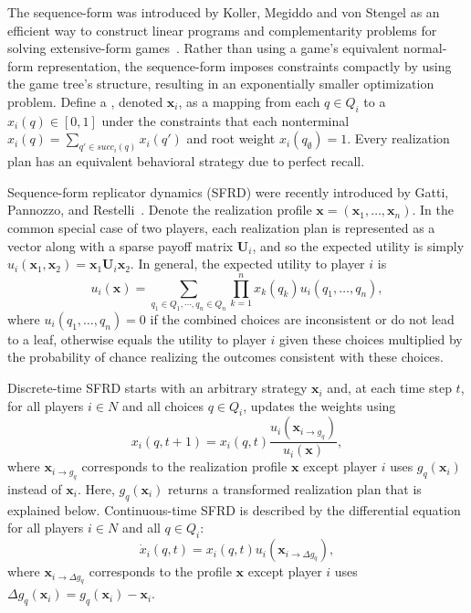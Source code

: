 \documentclass{aamas2014}
\newcommand{\bx}{\mathbf{x}}
\newcommand{\bU}{\mathbf{U}}
\newcommand{\defword}[1]{\textbf{\boldmath{#1}}}
\begin{document}
The sequence-form was introduced by Koller, Megiddo and von Stengel as an efficient way to construct
linear programs and complementarity problems for solving extensive-form games~\cite{SequenceFormLPs}. Rather than using a
game's equivalent normal-form representation, the sequence-form imposes constraints compactly by using the game tree's structure, 
resulting in an exponentially smaller optimization problem.
Define a \defword{realization plan}, denoted $\bx_i$, as a mapping from each $q \in Q_i$ to a \defword{realization weight} 
$x_i(q) \in [0,1]$ under the constraints that each nonterminal $x_i(q) = \sum_{q' \in succ_i(q)} x_i(q')$ and root weight $x_i(q_{\emptyset}) = 1$. 
Every realization plan has an equivalent behavioral strategy due to perfect recall. 

Sequence-form replicator dynamics (SFRD) were recently introduced by Gatti, Pannozzo, and Restelli~\cite{Gatti13Efficient}. 
Denote the realization profile $\bx = (\bx_1, \ldots, \bx_n)$. 
In the common special case of two players, each realization plan is represented as a vector along with a sparse payoff matrix $\bU_i$, 
and so the expected utility is simply $u_i(\bx_1, \bx_2) = \bx_1 \bU_i \bx_2$. 
In general, the expected utility to player $i$ is  
\begin{equation}
\label{eq:util}
u_i(\bx) = \sum_{q_1 \in Q_1, \cdots, q_n \in Q_n} \prod_{k=1}^n x_k(q_k) u_i(q_1, \ldots, q_n),
\end{equation}
where $u_i(q_1, \ldots, q_n) = 0$ if the combined choices are inconsistent or do not lead to a leaf, otherwise 
equals the utility to player $i$ given these choices multiplied by the probability of chance realizing the outcomes 
consistent with these choices. 

Discrete-time SFRD starts with an arbitrary strategy $\bx_i$ and, at each time step $t$, for all players $i \in N$ and all 
choices $q \in Q_i$, updates the weights using
\begin{equation}
\label{eq:dt-sfrd}
x_i(q,t+1) = x_i(q,t) \frac{u_i(\bx_{i \rightarrow g_{q}})}{u_i(\bx)},
\end{equation}
where $\bx_{i \rightarrow g_q}$ corresponds to the realization profile $\bx$ except player $i$ uses $g_q(\bx_i)$ instead of $\bx_i$. 
Here, $g_q(\bx_i)$ returns a transformed realization plan that is explained below. 
Continuous-time SFRD is described by the differential equation for all players $i \in N$ and all $q \in Q_i$:
\begin{equation}
\label{eq:ct-sfrd}
\dot{x}_i(q,t) = x_i(q,t) u_i(\bx_{i \rightarrow \Delta g_{q}}),
\end{equation}
where $\bx_{i \rightarrow \Delta g_q}$ corresponds to the profile $\bx$ except player $i$ uses $\Delta g_q(\bx_i) = g_q(\bx_i) - \bx_i$. 
\end{document}
